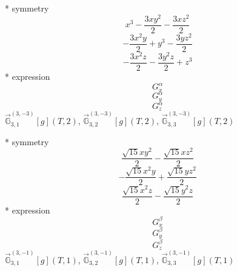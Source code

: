 \documentclass[fleqn,8pt]{jsarticle}
\begin{document}
\noindent\quad ** symmetry
\begin{dmath*}
x^{3} - \frac{3 x y^{2}}{2} - \frac{3 x z^{2}}{2}
\end{dmath*}
\begin{dmath*}
- \frac{3 x^{2} y}{2} + y^{3} - \frac{3 y z^{2}}{2}
\end{dmath*}
\begin{dmath*}
- \frac{3 x^{2} z}{2} - \frac{3 y^{2} z}{2} + z^{3}
\end{dmath*}
\noindent\quad ** expression
\begin{dmath*}
G_{x}^{\alpha}
\end{dmath*}
\begin{dmath*}
G_{y}^{\alpha}
\end{dmath*}
\begin{dmath*}
G_{z}^{\alpha}
\end{dmath*}
\noindent\quad $\vec{\mathbb{G}}_{3,1}^{(3,-3)}[g](T,2)$, $\vec{\mathbb{G}}_{3,2}^{(3,-3)}[g](T,2)$, $\vec{\mathbb{G}}_{3,3}^{(3,-3)}[g](T,2)$

\noindent\quad ** symmetry
\begin{dmath*}
\frac{\sqrt{15} x y^{2}}{2} - \frac{\sqrt{15} x z^{2}}{2}
\end{dmath*}
\begin{dmath*}
- \frac{\sqrt{15} x^{2} y}{2} + \frac{\sqrt{15} y z^{2}}{2}
\end{dmath*}
\begin{dmath*}
\frac{\sqrt{15} x^{2} z}{2} - \frac{\sqrt{15} y^{2} z}{2}
\end{dmath*}
\noindent\quad ** expression
\begin{dmath*}
G_{x}^{\beta}
\end{dmath*}
\begin{dmath*}
G_{y}^{\beta}
\end{dmath*}
\begin{dmath*}
G_{z}^{\beta}
\end{dmath*}
\noindent\quad $\vec{\mathbb{G}}_{3,1}^{(3,-1)}[g](T,1)$, $\vec{\mathbb{G}}_{3,2}^{(3,-1)}[g](T,1)$, $\vec{\mathbb{G}}_{3,3}^{(3,-1)}[g](T,1)$
\end{document}
